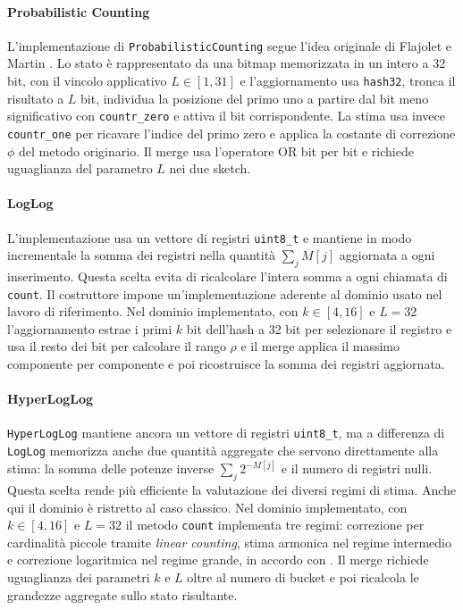 \paragraph{Probabilistic Counting}
L'implementazione di \texttt{ProbabilisticCounting} segue l'idea originale di
Flajolet e Martin \cite{Flajolet_Martin_1985}. Lo stato è rappresentato da una
bitmap memorizzata in un intero a 32 bit, con il vincolo applicativo
\(L \in [1,31]\) e l'aggiornamento usa \texttt{hash32}, tronca il risultato a
\(L\) bit, individua la posizione del primo uno a partire dal bit meno
significativo con \texttt{countr\_zero} e attiva il bit corrispondente. La stima
usa invece \texttt{countr\_one} per ricavare l'indice del primo zero e applica
la costante di correzione \(\phi\) del metodo originario. Il merge usa
l'operatore OR bit per bit e richiede uguaglianza del parametro \(L\) nei due
sketch.

\paragraph{LogLog}
L'implementazione usa un vettore di registri \texttt{uint8\_t} e mantiene in modo
incrementale la somma dei registri nella quantità \(\sum_j M[j]\) aggiornata a
ogni inserimento. Questa scelta evita di ricalcolare l'intera somma a ogni
chiamata di \texttt{count}. Il costruttore impone un'implementazione aderente
al dominio usato nel lavoro di riferimento. Nel dominio implementato, con
\(k \in [4,16]\) e \(L = 32\) l'aggiornamento estrae i primi \(k\) bit
dell'hash a 32 bit per selezionare il registro e usa il resto dei bit per
calcolare il rango \(\rho\) e il merge
applica il massimo componente per componente e poi ricostruisce la somma dei
registri aggiornata.

\paragraph{HyperLogLog}
\texttt{HyperLogLog} mantiene ancora un vettore di registri \texttt{uint8\_t},
ma a differenza di \texttt{LogLog} memorizza anche due quantità aggregate che
servono direttamente alla stima: la somma delle potenze inverse
\(\sum_j 2^{-M[j]}\) e il numero di registri nulli. Questa scelta rende più
efficiente la valutazione dei diversi regimi di stima. Anche qui il dominio è
ristretto al caso classico. Nel dominio implementato, con \(k \in [4,16]\) e
\(L = 32\) il metodo
\texttt{count} implementa tre regimi: correzione per cardinalità piccole tramite
\emph{linear counting}, stima armonica nel regime intermedio e correzione
logaritmica nel regime grande, in accordo con \cite{Flajolet_Fusy_Gandouet_Meunier_2007}.
Il merge richiede uguaglianza dei parametri \(k\) e \(L\) oltre al numero di
bucket e poi
ricalcola le grandezze aggregate sullo stato risultante.

